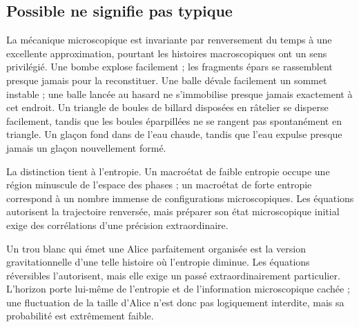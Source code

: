 \subsection{Possible ne signifie pas typique}

La mécanique microscopique est invariante par renversement du temps à une excellente approximation, pourtant les histoires macroscopiques ont un sens privilégié. Une bombe explose facilement ; les fragments épars se rassemblent presque jamais pour la reconstituer. Une balle dévale facilement un sommet instable ; une balle lancée au hasard ne s’immobilise presque jamais exactement à cet endroit. Un triangle de boules de billard disposées en râtelier se disperse facilement, tandis que les boules éparpillées ne se rangent pas spontanément en triangle. Un glaçon fond dans de l’eau chaude, tandis que l’eau expulse presque jamais un glaçon nouvellement formé.

La distinction tient à l’entropie. Un macroétat de faible entropie occupe une région minuscule de l’espace des phases ; un macroétat de forte entropie correspond à un nombre immense de configurations microscopiques. Les équations autorisent la trajectoire renversée, mais préparer son état microscopique initial exige des corrélations d’une précision extraordinaire.

\begin{classroomqa}
\end{classroomqa}

Un trou blanc qui émet une Alice parfaitement organisée est la version gravitationnelle d’une telle histoire où l’entropie diminue. Les équations réversibles l’autorisent, mais elle exige un passé extraordinairement particulier. L’horizon porte lui-même de l’entropie et de l’information microscopique cachée ; une fluctuation de la taille d’Alice n’est donc pas logiquement interdite, mais sa probabilité est extrêmement faible.

\begin{classroomqa}
\end{classroomqa}

